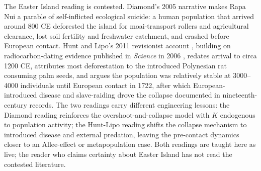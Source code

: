 The Easter Island reading is contested. Diamond's 2005 narrative
makes Rapa Nui a parable of self-inflicted ecological suicide: a
human population that arrived around 800 CE deforested the island
for moai-transport rollers and agricultural clearance, lost soil
fertility and freshwater catchment, and crashed before European
contact. Hunt and Lipo's 2011 revisionist account
\cite[chs.~4--6]{text:v6c08-hunt-lipo-2011}, building on
radiocarbon-dating evidence published in \emph{Science} in 2006
\cite[pp.~1603--1606]{paper:v6c08-hunt-lipo-rapanui-2006}, redates
arrival to circa 1200 CE, attributes most deforestation to the
introduced Polynesian rat consuming palm seeds, and argues the
population was relatively stable at 3000--4000 individuals until
European contact in 1722, after which European-introduced disease
and slave-raiding drove the collapse documented in nineteenth-century
records. The two readings carry different engineering lessons: the
Diamond reading reinforces the overshoot-and-collapse model with $K$
endogenous to population activity; the Hunt-Lipo reading shifts the
collapse mechanism to introduced disease and external predation,
leaving the pre-contact dynamics closer to an Allee-effect or
metapopulation case. Both readings are taught here as live; the
reader who claims certainty about Easter Island has not read the
contested literature.


